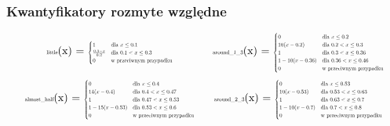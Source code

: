 \documentclass{article}
\begin{document}
\subsubsection{Kwantyfikatory rozmyte względne}

\begin{equation*}
\begin{minipage}{0.5\textwidth}
\centering
\text{\scalebox{0.5}{little}}(x) = \scalebox{0.5}{$
\begin{cases}
1 & \text{dla } x \leq 0.1 \\
\frac{0.3 - x}{0.2} & \text{dla } 0.1 < x \leq 0.3 \\
0 & \text{w przeciwnym przypadku}
\end{cases}
$}
\end{minipage}%
\begin{minipage}{0.5\textwidth}
\centering
\text{\scalebox{0.5}{around\_1\_3}}(x) = \scalebox{0.5}{$
\begin{cases}
0 & \text{dla } x \leq 0.2 \\
10(x - 0.2) & \text{dla } 0.2 < x \leq 0.3 \\
1 & \text{dla } 0.3 < x \leq 0.36 \\
1 - 10(x - 0.36) & \text{dla } 0.36 < x \leq 0.46 \\
0 & \text{w przeciwnym przypadku}
\end{cases}
$}
\end{minipage}
\end{equation*}
\begin{equation*}
\begin{minipage}{0.5\textwidth}
\centering
\text{\scalebox{0.5}{almost\_half}}(x) = \scalebox{0.5}{$
\begin{cases}
0 & \text{dla } x \leq 0.4 \\
14(x - 0.4) & \text{dla } 0.4 < x \leq 0.47 \\
1 & \text{dla } 0.47 < x \leq 0.53 \\
1 - 15(x - 0.53) & \text{dla } 0.53 < x \leq 0.6 \\
0 & \text{w przeciwnym przypadku}
\end{cases}
$}
\end{minipage}%
\begin{minipage}{0.5\textwidth}
\centering
\text{\scalebox{0.5}{around\_2\_3}}(x) = \scalebox{0.5}{$
\begin{cases}
0 & \text{dla } x \leq 0.53 \\
10(x - 0.53) & \text{dla } 0.53 < x \leq 0.63 \\
1 & \text{dla } 0.63 < x \leq 0.7 \\
1 - 10(x - 0.7) & \text{dla } 0.7 < x \leq 0.8 \\
0 & \text{w przeciwnym przypadku}
\end{cases}
$}
\end{minipage}
\end{equation*}
\end{document}
